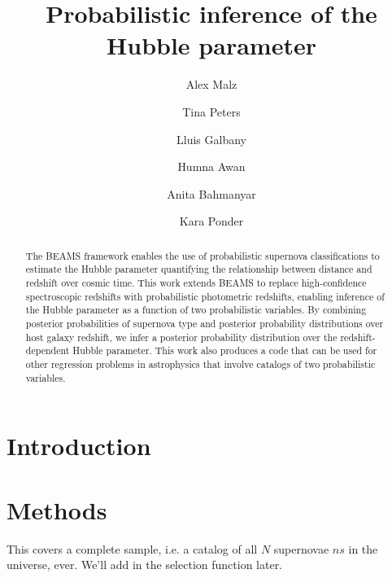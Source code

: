 \documentclass[12pt, onecolumn]{emulateapj}
\begin{document}
\title{Probabilistic inference of the Hubble parameter}

\author{Alex Malz}
\author{Tina Peters}
\author{Lluis Galbany}
\author{Humna Awan}
\author{Anita Bahmanyar}
\author{Kara Ponder}

\begin{abstract}
The BEAMS framework enables the use of probabilistic supernova classifications to estimate the Hubble parameter quantifying the relationship between distance and redshift over cosmic time.  This work extends BEAMS to replace high-confidence spectroscopic redshifts with probabilistic photometric redshifts, enabling inference of the Hubble parameter as a function of two probabilistic variables.  By combining posterior probabilities of supernova type and posterior probability distributions over host galaxy redshift, we infer a posterior probability distribution over the redshift-dependent Hubble parameter.  This work also produces a code that can be used for other regression problems in astrophysics that involve catalogs of two probabilistic variables.
\end{abstract}

\keywords{}

\section{Introduction}
\label{sec:intro}

\citet{kunz_bayesian_2007, kelly_flexible_2008, hlozek_photometric_2012}

\section{Methods}
\label{sec:meth}

This covers a complete sample, i.e. a catalog of all $N$ supernovae $ns$ in the universe, ever.  We'll add in the selection function later.
\end{document}
